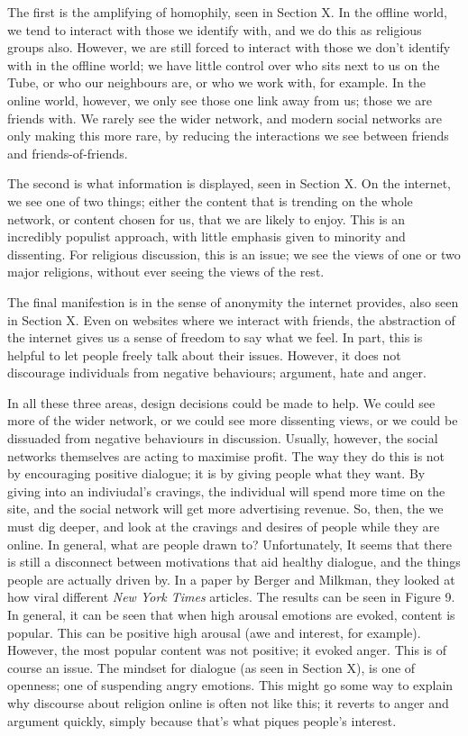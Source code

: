 \documentclass[]{article}
\begin{document}
The first is the amplifying of homophily, seen in Section X. In the
offline world, we tend to interact with those we identify with, and we
do this as religious groups also. However, we are still forced to
interact with those we don't identify with in the offline world; we have
little control over who sits next to us on the Tube, or who our
neighbours are, or who we work with, for example. In the online world,
however, we only see those one link away from us; those we are friends
with. We rarely see the wider network, and modern social networks are
only making this more rare, by reducing the interactions we see between
friends and friends-of-friends.

The second is what information is displayed, seen in Section X. On the
internet, we see one of two things; either the content that is trending
on the whole network, or content chosen for us, that we are likely to
enjoy. This is an incredibly populist approach, with little emphasis
given to minority and dissenting. For religious discussion, this is an
issue; we see the views of one or two major religions, without ever
seeing the views of the rest.

The final manifestion is in the sense of anonymity the internet
provides, also seen in Section X. Even on websites where we interact
with friends, the abstraction of the internet gives us a sense of
freedom to say what we feel. In part, this is helpful to let people
freely talk about their issues. However, it does not discourage
individuals from negative behaviours; argument, hate and anger.

In all these three areas, design decisions could be made to help. We
could see more of the wider network, or we could see more dissenting
views, or we could be dissuaded from negative behaviours in discussion.
Usually, however, the social networks themselves are acting to maximise
profit. The way they do this is not by encouraging positive dialogue; it
is by giving people what they want. By giving into an indiviudal's
cravings, the individual will spend more time on the site, and the
social network will get more advertising revenue. So, then, the we must
dig deeper, and look at the cravings and desires of people while they
are online. In general, what are people drawn to? Unfortunately, It
seems that there is still a disconnect between motivations that aid
healthy dialogue, and the things people are actually driven by. In a
paper by Berger and Milkman\autocite{BergerWhatMakesOnline2012}, they
looked at how viral different \emph{New York Times} articles. The
results can be seen in Figure 9. In general, it can be seen that when
high arousal emotions are evoked, content is popular. This can be
positive high arousal (awe and interest, for example). However, the most
popular content was not positive; it evoked anger. This is of course an
issue. The mindset for dialogue (as seen in Section X), is one of
openness; one of suspending angry emotions. This might go some way to
explain why discourse about religion online is often not like this; it
reverts to anger and argument quickly, simply because that's what piques
people's interest.
\end{document}
